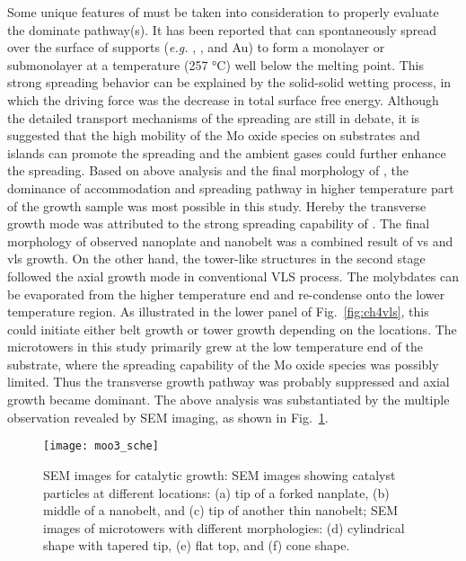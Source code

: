 Some unique features of  must be taken into consideration to properly evaluate the dominate pathway(s). It has been reported that  can spontaneously spread over the surface of supports (\emph{e.g.} , , and Au) to form a monolayer or submonolayer at a temperature (257 \si{\degreeCelsius}) well below the melting point.\cite{Leyrer1990} This strong spreading behavior can be explained by the solid-solid wetting process, in which the driving force was the decrease in total surface free energy.\cite{Leyrer1988} Although the detailed transport mechanisms of the spreading are still in debate, it is suggested that the high mobility of the Mo oxide species on substrates and  islands can promote the spreading and the ambient gases could further enhance the spreading.\cite{Gunther2000, Song2003} Based on above analysis and the final morphology of , the dominance of accommodation and spreading pathway in higher temperature part of the growth sample was most possible in this study. Hereby the transverse growth mode was attributed to the strong spreading capability of . The final morphology of observed nanoplate and nanobelt was a combined result of \gls{vs} and \gls{vls} growth. On the other hand, the tower-like structures in the second stage followed the axial growth mode in conventional VLS process. The molybdates can be evaporated from the higher temperature end and re-condense onto the lower temperature region. As illustrated in the lower panel of Fig.~\ref{fig:ch4vls}, this could initiate either belt growth or tower growth depending on the locations. The microtowers in this study primarily grew at the low temperature end of the substrate, where the spreading capability of the Mo oxide species was possibly limited. Thus the transverse growth pathway was probably suppressed and axial growth became dominant. The above analysis was substantiated by the multiple observation revealed by SEM imaging, as shown in Fig.~\ref{fig:ch4msch}.
\begin{figure}[htb]
\centering
\texttt{[image: moo3\_sche]}
\caption[SEM images for catalytic  growth]{SEM images for catalytic  growth: SEM images showing catalyst particles at different locations: (a) tip of a forked nanplate, (b) middle of a nanobelt, and (c) tip of another thin nanobelt; SEM images of microtowers with different morphologies: (d) cylindrical shape with tapered tip, (e) flat top, and (f) cone shape. }
\label{fig:ch4msch}
\end{figure}

